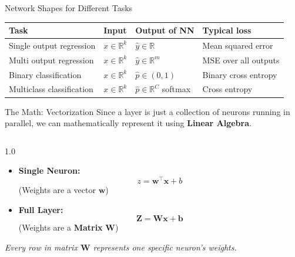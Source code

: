 \begin{frame}{Network Shapes for Different Tasks}
    \centering
    \small
    \begin{tabular}{l l l l}
        \toprule
        Task 
        & Input 
        & Output of NN 
        & Typical loss \\
        \midrule
        Single output regression 
        & \(x \in \mathbb{R}^k\) 
        & \(\hat{y} \in \mathbb{R}\) 
        & Mean squared error \\
        Multi output regression 
        & \(x \in \mathbb{R}^k\) 
        & \(\hat{y} \in \mathbb{R}^m\) 
        & MSE over all outputs \\
        Binary classification 
        & \(x \in \mathbb{R}^k\) 
        & \(\hat{p} \in (0, 1)\) 
        & Binary cross entropy \\
        Multiclass classification 
        & \(x \in \mathbb{R}^k\) 
        & \(\hat{p} \in \mathbb{R}^C\) softmax 
        & Cross entropy \\
        \bottomrule
    \end{tabular}
\end{frame}

\begin{frame}{The Math: Vectorization}
    Since a layer is just a collection of neurons running in parallel, we can mathematically represent it using \textbf{Linear Algebra}.
    
    \vspace{1em}
    \begin{columns}[c]
        \begin{column}{1.0\textwidth}
            \begin{itemize}
                \item \textbf{Single Neuron:} 
                $$z = \mathbf{w}^\top \mathbf{x} + b$$
                (Weights are a vector $\mathbf{w}$)
                \vspace{1em}
                \item \textbf{Full Layer:} 
                $$\mathbf{Z} = \mathbf{W} \mathbf{x} + \mathbf{b}$$
                (Weights are a \textbf{Matrix} $\mathbf{W}$)
            \end{itemize}
            
            \vspace{1.5em}
            \small
            \textit{Every row in matrix $\mathbf{W}$ represents one specific neuron's weights.}
        \end{column}
        
            
    \end{columns}
\end{frame}

